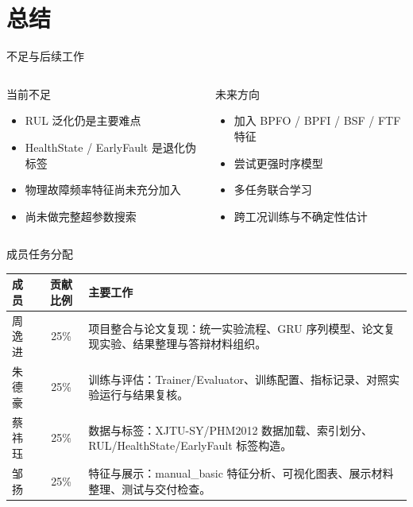 \documentclass[aspectratio=169,11pt]{ctexbeamer}
\begin{document}
\section{总结}

\begin{frame}[t]{不足与后续工作}
  \begin{columns}[T,onlytextwidth]
    \begin{column}{0.50\textwidth}
      \begin{block}{当前不足}
        \begin{itemize}
          \item RUL 泛化仍是主要难点
          \item HealthState / EarlyFault 是退化伪标签
          \item 物理故障频率特征尚未充分加入
          \item 尚未做完整超参数搜索
        \end{itemize}
      \end{block}
    \end{column}
    \begin{column}{0.47\textwidth}
      \begin{block}{未来方向}
        \begin{itemize}
          \item 加入 BPFO / BPFI / BSF / FTF 特征
          \item 尝试更强时序模型
          \item 多任务联合学习
          \item 跨工况训练与不确定性估计
        \end{itemize}
      \end{block}
    \end{column}
  \end{columns}
\end{frame}

\begin{frame}[t]{成员任务分配}
  \begin{table}
    \scriptsize
    \begin{tabularx}{\linewidth}{lcY}
      \toprule
      成员 & 贡献比例 & 主要工作 \\
      \midrule
      周逸进 & 25\% & 项目整合与论文复现：统一实验流程、GRU 序列模型、论文复现实验、结果整理与答辩材料组织。 \\
      朱德豪 & 25\% & 训练与评估：Trainer/Evaluator、训练配置、指标记录、对照实验运行与结果复核。 \\
      蔡祎珏 & 25\% & 数据与标签：XJTU-SY/PHM2012 数据加载、索引划分、RUL/HealthState/EarlyFault 标签构造。 \\
      邹扬 & 25\% & 特征与展示：manual\_basic 特征分析、可视化图表、展示材料整理、测试与交付检查。 \\
      \bottomrule
    \end{tabularx}
  \end{table}
\end{frame}
\end{document}
